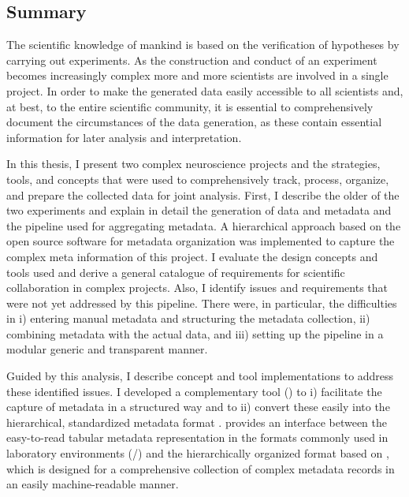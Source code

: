 \cleardoublepage
\thispagestyle{empty}
\subsection*{Summary}
\label{sec:summary}
\begin{minipage}[t][0pt]{\linewidth}
The scientific knowledge of mankind is based on the verification of hypotheses by carrying out experiments.
As the construction and conduct of an experiment becomes increasingly complex more and more scientists are involved in a single project. In order to make the generated data easily accessible to all scientists and, at best, to the entire scientific community, it is essential to comprehensively document the circumstances of the data generation, as these contain essential information for later analysis and interpretation.

In this thesis, I present two complex neuroscience projects and the strategies, tools, and concepts that were used to comprehensively track, process, organize, and prepare the collected data for joint analysis. First, I describe the older of the two experiments and explain in detail the generation of data and metadata and the pipeline used for aggregating metadata. A hierarchical approach based on the open source software  for metadata organization was implemented to capture the complex meta information of this project. I evaluate the design concepts and tools used and derive a general catalogue of requirements for scientific collaboration in complex projects. Also, I identify issues and requirements that were not yet addressed by this pipeline. There were, in particular, the difficulties in i) entering manual metadata and structuring the metadata collection, ii) combining metadata with the actual data, and iii) setting up the pipeline in a modular generic and transparent manner. 

Guided by this analysis, I describe concept and tool implementations to address these identified issues. I developed a complementary tool () to i) facilitate the capture of metadata in a structured way and to ii) convert these easily into the hierarchical, standardized metadata format .  provides an interface between the easy-to-read tabular metadata representation in the formats commonly used in laboratory environments (/) and the hierarchically organized  format based on , which is designed for a comprehensive collection of complex metadata records in an easily machine-readable manner.


\end{minipage}
